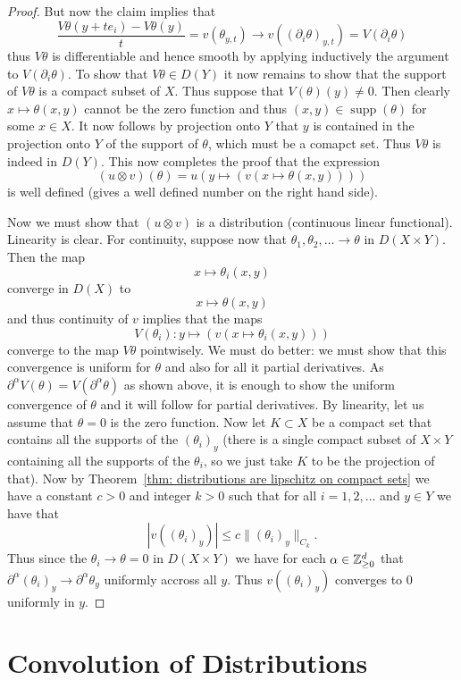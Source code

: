 \documentclass[twoside, a4paper, 10pt]{amsart}
\begin{document}
\begin{proof}
But now the claim implies that $$\frac{V\theta (y+te_i) - V\theta(y)}{t} = v(\theta_{y,t}) \to v((\partial_i\theta)_{y,t}) = V(\partial_i \theta)$$ thus $V\theta$ is differentiable and hence smooth by applying inductively the argument to $V(\partial_i \theta)$. To show that $V\theta \in D(Y)$ it now remains to show that the support of $V\theta$ is a compact subset of $X$. Thus suppose that $V(\theta)(y) \neq 0$. Then clearly $x \mapsto \theta(x,y)$ cannot be the zero function and thus $(x,y) \in \operatorname{supp}(\theta)$ for some $x \in X$. It now follows by projection onto $Y$ that $y$ is contained in the projection onto $Y$ of the support of $\theta$, which must be a comapct set. Thus $V\theta$ is indeed in $D(Y)$. This now completes the proof that the expression $$(u \otimes v)(\theta) = u(y \mapsto (v(x \mapsto \theta(x,y))))$$ is well defined (gives a well defined number on the right hand side). 

Now we must show that $(u \otimes v)$ is a distribution (continuous linear functional). Linearity is clear. For continuity, suppose now that  $\theta_1, \theta_2, \ldots \to \theta$ in $D(X \times Y)$. Then the map $$x \mapsto \theta_i(x,y)$$ converge in $D(X)$ to $$x \mapsto \theta(x,y)$$ and thus continuity of $v$ implies that the maps $$V(\theta_i): y \mapsto (v(x \mapsto \theta_i(x,y)))$$ converge to the map $V\theta$ pointwisely. We must do better: we must show that this convergence is uniform for $\theta$ and also for all it partial derivatives. As $\partial^{\alpha}V(\theta) = V(\partial^{\alpha}\theta)$ as shown above, it is enough to show the uniform convergence of $\theta$ and it will follow for partial derivatives. By linearity, let us assume that $\theta = 0$ is the zero function. Now let $K \subset X$ be a compact set that contains all the supports of the $(\theta_i)_y$ (there is a single compact subset of $X \times Y$ containing all the supports of the $\theta_i$, so we just take $K$ to be the projection of that). Now by Theorem~\ref{thm: distributions are lipschitz on compact sets} we have a constant $c>0$ and integer $k>0$ such that for all $i=1,2,\ldots$ and $y \in Y$ we have that $$ |v((\theta_i)_y)| \leq c\| (\theta_i)_y \|_{C_k} .$$ Thus since the $\theta_i \to \theta = 0$ in $D(X \times Y)$ we have for each $\alpha \in \mathbb{Z}_{\geq 0}^d$ that $\partial^{\alpha} (\theta_i)_y \to \partial^{\alpha} \theta_y $ uniformly accross all $y$. Thus $v((\theta_i)_y)$ converges to $0$ uniformly in $y$. \end{proof}


\section{Convolution of Distributions}
\end{document}
